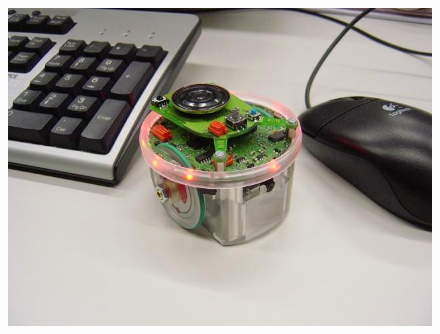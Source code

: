 \begin{figure}[H]
	\centering
	\begin{minipage}{.5\textwidth}
		\centering
		\includegraphics[width=.85\linewidth]{epuck}
		\label{fig:epuck-pic}
	\end{minipage}%
\end{figure}

